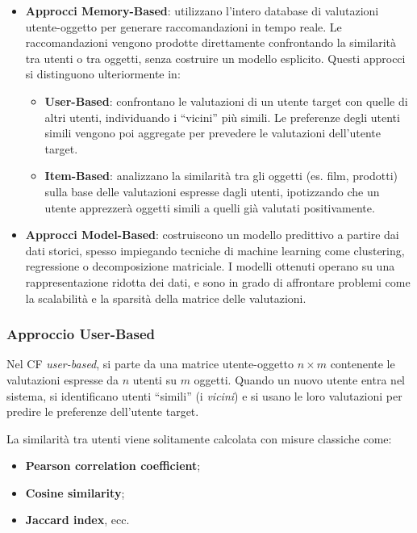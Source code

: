 \begin{itemize}
    \item \textbf{Approcci Memory-Based}: utilizzano l’intero database di valutazioni utente-oggetto per generare raccomandazioni in tempo reale. Le raccomandazioni vengono prodotte direttamente confrontando la similarità tra utenti o tra oggetti, senza costruire un modello esplicito. Questi approcci si distinguono ulteriormente in:
    \begin{itemize}
        \item \textbf{User-Based}: confrontano le valutazioni di un utente target con quelle di altri utenti, individuando i “vicini” più simili. Le preferenze degli utenti simili vengono poi aggregate per prevedere le valutazioni dell’utente target.
        \item \textbf{Item-Based}: analizzano la similarità tra gli oggetti (es. film, prodotti) sulla base delle valutazioni espresse dagli utenti, ipotizzando che un utente apprezzerà oggetti simili a quelli già valutati positivamente.
    \end{itemize}
    \item \textbf{Approcci Model-Based}: costruiscono un modello predittivo a partire dai dati storici, spesso impiegando tecniche di machine learning come clustering, regressione o decomposizione matriciale. I modelli ottenuti operano su una rappresentazione ridotta dei dati, e sono in grado di affrontare problemi come la scalabilità e la sparsità della matrice delle valutazioni.
\end{itemize}

\subsubsection{Approccio User-Based} 

Nel CF \emph{user-based}, si parte da una matrice utente-oggetto $n \times m$ contenente le valutazioni espresse da $n$ utenti su $m$ oggetti. Quando un nuovo utente entra nel sistema, si identificano utenti “simili” (i \emph{vicini}) e si usano le loro valutazioni per predire le preferenze dell’utente target.

La similarità tra utenti viene solitamente calcolata con misure classiche come:

\begin{itemize}
    \item \textbf{Pearson correlation coefficient};
    \item \textbf{Cosine similarity};
    \item \textbf{Jaccard index}, ecc.
\end{itemize}

